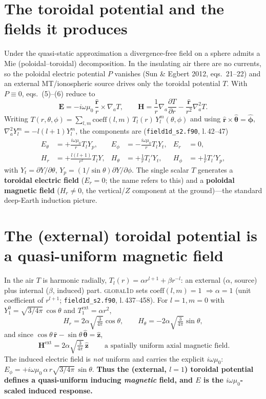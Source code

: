 \documentclass[11pt]{article}
\newcommand{\rhat}{\hat{\mathbf r}}
\newcommand{\zhat}{\hat{\mathbf z}}
\newcommand{\that}{\hat{\boldsymbol\theta}}
\begin{document}
\section{The toroidal potential and the fields it produces}
Under the quasi-static approximation a divergence-free field on a sphere admits a Mie
(poloidal--toroidal) decomposition. In the insulating air there are no currents, so the poloidal
electric potential $P$ vanishes (Sun \& Egbert 2012, eqs.~21--22) and an external MT/ionospheric
source drives only the toroidal potential $T$. With $P\equiv0$, eqs.~(5)--(6) reduce to
\begin{equation}
\mathbf E=-i\omega\mu_0\,\frac{\rhat}{r}\times\nabla_a T,\qquad
\mathbf H=\frac1r\nabla_a\frac{\partial T}{\partial r}-\frac{\rhat}{r^2}\nabla_a^2 T .
\end{equation}
Writing $T(r,\theta,\phi)=\sum_{l,m}\mathrm{coeff}(l,m)\,T_l(r)\,Y_l^m(\theta,\phi)$ and using
$\rhat\times\that=\hat{\boldsymbol\phi}$, $\nabla_a^2 Y_l^m=-l(l+1)Y_l^m$, the components are
(\texttt{field1d\_s2.f90}, l.\,42--47)
\begin{equation}
\begin{aligned}
E_\theta&=+\tfrac{i\omega\mu_0}{r}T_l Y_p, & E_\phi&=-\tfrac{i\omega\mu_0}{r}T_l Y_t, & E_r&=0,\\
H_r&=+\tfrac{l(l+1)}{r^2}T_l Y, & H_\theta&=+\tfrac1r T_l' Y_t, & H_\phi&=+\tfrac1r T_l' Y_p,
\end{aligned}
\end{equation}
with $Y_t=\partial Y/\partial\theta$, $Y_p=(1/\sin\theta)\partial Y/\partial\phi$. The single scalar
$T$ generates a \textbf{toroidal electric field} ($E_r=0$; the name refers to this) and a
\textbf{poloidal magnetic field} ($H_r\neq0$, the vertical/$Z$ component at the ground)---the
standard deep-Earth induction picture.

\section{The (external) toroidal potential is a quasi-uniform magnetic field}
In the air $T$ is harmonic radially, $T_l(r)=\alpha r^{l+1}+\beta r^{-l}$: an external ($\alpha$,
source) plus internal ($\beta$, induced) part. \textsc{global1d} sets $\mathrm{coeff}(l,m)=1$
$\Rightarrow\alpha=1$ (unit coefficient of $r^{l+1}$; \texttt{field1d\_s2.f90}, l.\,437--458). For
$l=1,m=0$ with $Y_1^0=\sqrt{3/4\pi}\,\cos\theta$ and $T_1^{\mathrm{ext}}=\alpha r^2$,
\begin{equation}
H_r=2\alpha\sqrt{\tfrac{3}{4\pi}}\cos\theta,\qquad
H_\theta=-2\alpha\sqrt{\tfrac{3}{4\pi}}\sin\theta,
\end{equation}
and since $\cos\theta\,\rhat-\sin\theta\,\that=\zhat$,
\begin{equation}
\boxed{\ \mathbf H^{\mathrm{ext}}=2\alpha\sqrt{\tfrac{3}{4\pi}}\,\zhat\ }
\qquad\text{a spatially uniform axial magnetic field.}
\end{equation}
The induced electric field is \emph{not} uniform and carries the explicit $i\omega\mu_0$:
$E_\phi=+i\omega\mu_0\,\alpha\,r\sqrt{3/4\pi}\,\sin\theta$. \textbf{Thus the (external, $l=1$)
toroidal potential defines a quasi-uniform inducing \emph{magnetic} field, and $E$ is the
$i\omega\mu_0$-scaled induced response.}
\end{document}
